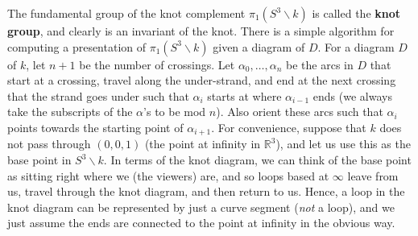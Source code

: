 The fundamental group of the knot complement $\pi_1(S^3 \backslash k)$ is called the \textbf{knot group}, and clearly is an invariant of the knot. There is a simple algorithm for computing a presentation of $\pi_1(S^3 \backslash k)$ given a diagram of $D$. For a diagram $D$ of $k$, let $n+1$ be the number of crossings. Let $\alpha_0,\ldots,\alpha_n$ be the arcs in $D$ that start at a crossing, travel along the under-strand, and end at the next crossing that the strand goes under such that $\alpha_i$ starts at where $\alpha_{i-1}$ ends (we always take the subscripts of the $\alpha$'s to be mod $n$). Also orient these arcs such that $\alpha_i$ points towards the starting point of $\alpha_{i+1}$. For convenience, suppose that $k$ does not pass through $(0,0,1)$ (the point at infinity in $\mathbb R^3$), and let us use this as the base point in $S^3 \backslash k$. In terms of the knot diagram, we can think of the base point as sitting right where we (the viewers) are, and so loops based at $\infty$ leave from us, travel through the knot diagram, and then return to us. Hence, a loop in the knot diagram can be represented by just a curve segment (\emph{not} a loop), and we just assume the ends are connected to the point at infinity in the obvious way.

